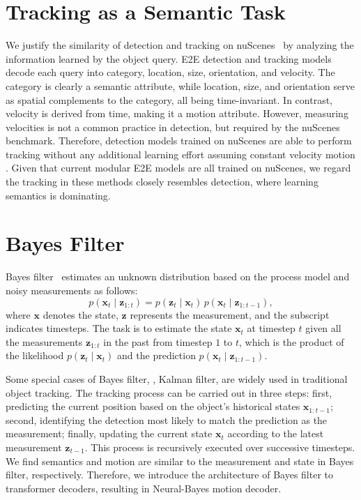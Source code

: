 \clearpage
\setcounter{page}{1}
\maketitlesupplementary

\section{Tracking as a Semantic Task}
\label{app:tracking}


We justify the similarity of detection and tracking on nuScenes~\cite{caesar2020nuscenes} by analyzing the information learned by the object query. \Gls{E2E} detection and tracking models decode each query into category, location, size, orientation, and velocity.
The category is clearly a semantic attribute, while location, size, and orientation serve as spatial complements to the category, all being time-invariant. In contrast, velocity is derived from time, making it a motion attribute.
However, measuring velocities is not a common practice in detection, but required by the nuScenes benchmark. Therefore, detection models trained on nuScenes are able to perform tracking without any additional learning effort assuming constant velocity motion \cite{zhang2022mutr3d, hu2023planning, lin2023sparse4d, gu2023vip3d}. 
Given that current modular \gls{E2E} models are all trained on nuScenes, we regard the tracking in these methods closely resembles detection, where learning semantics is dominating. 







\section{Bayes Filter}
\label{app:bayes_filter}
Bayes filter~\cite{thrun2005probabilistic} estimates an unknown distribution based on the process model and noisy measurements as follows:
\begin{equation}
  p(\mathbf{x}_t\; |\; \mathbf{z}_{1:t}) = p(\mathbf{z}_t\; |\; \mathbf{x}_t)\, p(\mathbf{x}_t\; |\; \mathbf{z}_{1:t-1}),
\end{equation}
where $\mathbf{x}$ denotes the state, $\mathbf{z}$ represents the measurement, and the subscript indicates timesteps. The task is to estimate the state $\mathbf{x}_t$ at timestep $t$ given all the measurements $\mathbf{z}_{1:t}$ in the past from timestep $1$ to $t$, which is the product of the likelihood $p(\mathbf{z}_t\; |\; \mathbf{x}_t)$ and the prediction $p(\mathbf{x}_t\; |\; \mathbf{z}_{1:t-1})$.

Some special cases of Bayes filter, \eg, Kalman filter, are widely used in traditional object tracking. The tracking process can be carried out in three steps: first, predicting the current position based on the object's historical states $\mathbf{x}_{1:t-1}$; second, identifying the detection most likely to match the prediction as the measurement; finally, updating the current state $\mathbf{x}_{t}$ according to the latest measurement $\mathbf{z}_{t-1}$. This process is recursively executed over successive timesteps. We find semantics and motion are similar to the measurement and state in Bayes filter, respectively. Therefore, we introduce the architecture of Bayes filter to transformer decoders, resulting in Neural-Bayes motion decoder.


